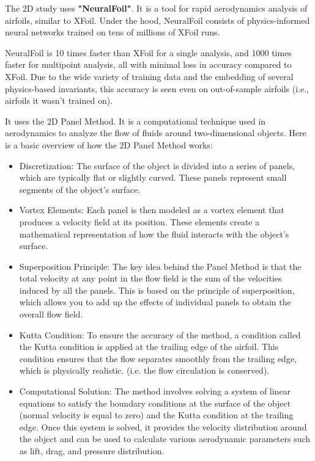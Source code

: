 The 2D study uses \textbf{"NeuralFoil"}. It is a tool for rapid aerodynamics analysis of airfoils, similar to XFoil. Under the hood, NeuralFoil consists of physics-informed neural networks trained on tens of millions of XFoil runs.

NeuralFoil is 10 times faster than XFoil for a single analysis, and 1000 times faster for multipoint analysis, all with minimal loss in accuracy compared to XFoil. Due to the wide variety of training data and the embedding of several physics-based invariants, this accuracy is seen even on out-of-sample airfoils (i.e., airfoils it wasn't trained on). \cite{neuralfoil}

It uses the 2D Panel Method. It is a computational technique used in aerodynamics to analyze the flow of fluids around two-dimensional objects.
Here is a basic overview of how the 2D Panel Method works:
\begin{itemize}
    \item Discretization: The surface of the object is divided into a series of panels, which are typically flat or slightly curved. These panels represent small segments of the object's surface.
    \item Vortex Elements: Each panel is then modeled as a vortex element that produces a velocity field at its position. These elements create a mathematical representation of how the fluid interacts with the object's surface.
    \item Superposition Principle: The key idea behind the Panel Method is that the total velocity at any point in the flow field is the sum of the velocities induced by all the panels. This is based on the principle of superposition, which allows you to add up the effects of individual panels to obtain the overall flow field.
    \item Kutta Condition: To ensure the accuracy of the method, a condition called the Kutta condition is applied at the trailing edge of the airfoil. This condition ensures that the flow separates smoothly from the trailing edge, which is physically realistic. (i.e. the flow circulation is conserved).
    \item Computational Solution: The method involves solving a system of linear equations to satisfy the boundary conditions at the surface of the object (normal velocity is equal to zero) and the Kutta condition at the trailing edge. Once this system is solved, it provides the velocity distribution around the object and can be used to calculate various aerodynamic parameters such as lift, drag, and pressure distribution.
\end{itemize}

